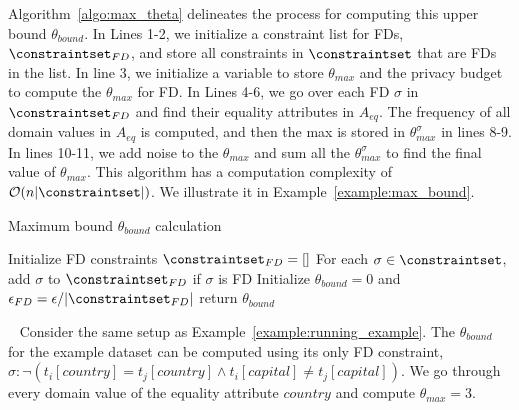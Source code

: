Algorithm~\ref{algo:max_theta} delineates the process for computing this upper bound $\theta_{bound}$.  In Lines 1-2, we initialize a constraint list for FDs, $\constraintset_{FD}$, and store all constraints in $\constraintset$ that are FDs in the list. In line 3, we initialize a variable to store $\theta_{max}$ and the privacy budget to compute the $\theta_{max}$ for FD. In Lines 4-6, we go over each FD $\sigma$ in $\constraintset_{FD}$ and find their equality attributes in $A_{eq}$. The frequency of all domain values in $A_{eq}$ is computed, and then the max is stored in $\theta_{max}^\sigma$ in lines 8-9. In lines 10-11, we add noise to the $\theta_{max}$ and sum all the $\theta_{max}^\sigma$ to find the final value of $\theta_{max}$. This algorithm has a computation complexity of $\mathcal{O}(n|\constraintset|)$. We illustrate it in Example~\ref{example:max_bound}.

\begin{algorithm}
\caption{Maximum bound $\theta_{bound}$ calculation}\label{algo:max_theta}
    Initialize FD constraints $\constraintset_{FD} = []$\;
    For each $\sigma \in \constraintset$, add $\sigma$ to $\constraintset_{FD}$ if $\sigma$ is FD\;
    Initialize $\theta_{bound} = 0$ and $\epsilon_{FD} = \epsilon/|\constraintset_{FD}|$\;
   return $\theta_{bound}$\;
\end{algorithm}

\begin{example}~\label{example:max_bound}
    Consider the same setup as Example~\ref{example:running_example}. The $\theta_{bound}$ for the example dataset can be computed using its only FD constraint, $\sigma: \neg (t_i[country]=t_j[country] \land t_i[capital] \neq t_j[capital])$. We go through every domain value of the equality attribute $country$ and compute $\theta_{max} = 3$. 
\end{example}


